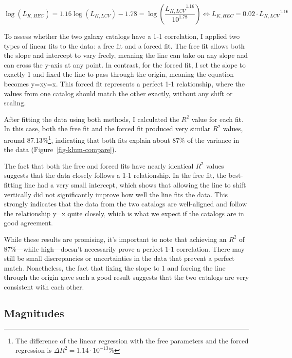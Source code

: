 \documentclass[
]{article}
\begin{document}
\[
\log(L_{K,HEC})=1.16\log(L_{K,LCV})-1.78=\log\left(\frac{{L_{K,LCV}}^{1.16}}{10^{1.78}}\right) \Leftrightarrow L_{K,HEC}=0.02\cdot{L_{K,LCV}}^{1.16}
\]

To assess whether the two galaxy catalogs have a 1-1 correlation, I
applied two types of linear fits to the data: a free fit and a forced
fit. The free fit allows both the slope and intercept to vary freely,
meaning the line can take on any slope and can cross the y-axis at any
point. In contrast, for the forced fit, I set the slope to exactly 1 and
fixed the line to pass through the origin, meaning the equation becomes
y=xy=x. This forced fit represents a perfect 1-1 relationship, where the
values from one catalog should match the other exactly, without any
shift or scaling.

After fitting the data using both methods, I calculated the \(R^2\)
value for each fit. In this case, both the free fit and the forced fit
produced very similar \(R^2\) values, around 87.13\%\footnote{The
  difference of the linear regression with the free parameters and the
  forced regression is \(\Delta R^2 = 1.14\cdot 10^{-13}\%\)},
indicating that both fits explain about 87\% of the variance in the data
(Figure~\ref{fig-klum-compare}).

The fact that both the free and forced fits have nearly identical
\(R^2\) values suggests that the data closely follows a 1-1
relationship. In the free fit, the best-fitting line had a very small
intercept, which shows that allowing the line to shift vertically did
not significantly improve how well the line fits the data. This strongly
indicates that the data from the two catalogs are well-aligned and
follow the relationship y=x quite closely, which is what we expect if
the catalogs are in good agreement.

While these results are promising, it's important to note that achieving
an \(R^2\) of 87\%---while high---doesn't necessarily prove a perfect
1-1 correlation. There may still be small discrepancies or uncertainties
in the data that prevent a perfect match. Nonetheless, the fact that
fixing the slope to 1 and forcing the line through the origin gave such
a good result suggests that the two catalogs are very consistent with
each other.

\subsection{Magnitudes}\label{magnitudes}
\end{document}
